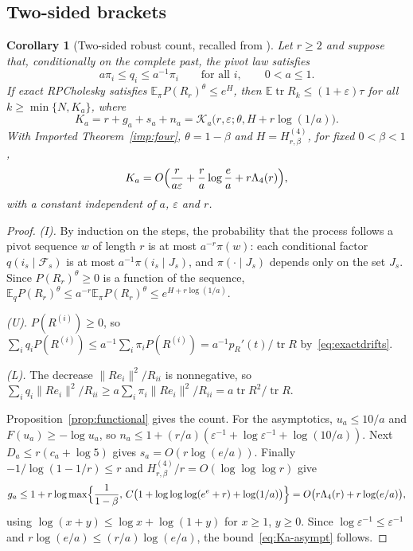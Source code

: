 \documentclass[11pt]{article}
\newtheorem{corollary}[theorem]{Corollary}
\theoremstyle{definition}\newtheorem{definition}[theorem]{Definition}
\theoremstyle{remark}\newtheorem{remark}[theorem]{Remark}
\newcommand{\E}{\mathbb E}
\newcommand{\eps}{\varepsilon}
\newcommand{\tr}{\operatorname{tr}}
\newcommand{\calK}{\mathcal K}
\newcommand{\calF}{\mathcal F}
\newcommand{\1}{\mathbf 1}
\begin{document}
\subsection{Two-sided brackets}
\begin{corollary}[Two-sided robust count, recalled from {\cite[Proposition 8.1]{RA01}}]\label{cor:two-sided}
Let $r\ge2$ and suppose that, conditionally on the complete past, the
pivot law satisfies
\begin{equation}\label{eq:two-sided}
 a\pi_i\le q_i\le a^{-1}\pi_i\qquad\text{for all }i,\qquad 0<a\le1.
\end{equation}
If exact RPCholesky satisfies $\E_\pi P(R_r)^\theta\le e^H$, then
$\E\tr R_k\le(1+\eps)\tau$ for all
$k\ge\min\{N,K_a\}$, where
\[
 K_a=r+g_a+s_a+n_a=\calK_a\bigl(r,\eps;\theta,H+r\log(1/a)\bigr).
\]
With Imported Theorem~\ref{imp:four}, $\theta=1-\beta$ and
$H=H^{(4)}_{r,\beta}$, for fixed $0<\beta<1$,
\begin{equation}\label{eq:Ka-asympt}
 K_a=O\Bigl(\frac r{a\eps}+\frac ra\log\frac ea+r\Lambda_4(r)\Bigr),
\end{equation}
with a constant independent of $a$, $\eps$ and $r$.
\end{corollary}
\begin{proof}
\emph{(I).} By induction on the steps, the probability that the process
follows a pivot sequence $w$ of length $r$ is at most $a^{-r}\pi(w)$:
each conditional factor $q(i_s\mid\calF_s)$ is at most
$a^{-1}\pi(i_s\mid J_s)$, and $\pi(\cdot\mid J_s)$ depends only on the
set $J_s$. Since $P(R_r)^\theta\ge0$ is a function of the sequence,
$\E_qP(R_r)^\theta\le a^{-r}\E_\pi P(R_r)^\theta\le e^{H+r\log(1/a)}$.

\emph{(U).} $P(R^{(i)})\ge0$, so
$\sum_iq_iP(R^{(i)})\le a^{-1}\sum_i\pi_iP(R^{(i)})=a^{-1}p_R'(t)/\tr R$
by~\eqref{eq:exactdrifts}.

\emph{(L).} The decrease $\|Re_i\|^2/R_{ii}$ is nonnegative, so
$\sum_iq_i\|Re_i\|^2/R_{ii}\ge a\sum_i\pi_i\|Re_i\|^2/R_{ii}
=a\tr R^2/\tr R$.

Proposition~\ref{prop:functional} gives the count. For the asymptotics,
$u_a\le10/a$ and $F(u_a)\ge-\log u_a$, so
$n_a\le1+(r/a)(\eps^{-1}+\log\eps^{-1}+\log(10/a))$. Next
$D_a\le r(c_a+\log5)$ gives $s_a=O(r\log(e/a))$. Finally
$-1/\log(1-1/r)\le r$ and $H^{(4)}_{r,\beta}/r=O(\log\log\log r)$ give
\[
 g_a\le1+r\log\max\Bigl\{\frac1{1-\beta},\,
 C\bigl(1+\log\log\log(e^e+r)+\log(1/a)\bigr)\Bigr\}
 =O\bigl(r\Lambda_4(r)+r\log(e/a)\bigr),
\]
using $\log(x+y)\le\log x+\log(1+y)$ for $x\ge1$, $y\ge0$. Since
$\log\eps^{-1}\le\eps^{-1}$ and $r\log(e/a)\le(r/a)\log(e/a)$, the
bound~\eqref{eq:Ka-asympt} follows.
\end{proof}
\end{document}
